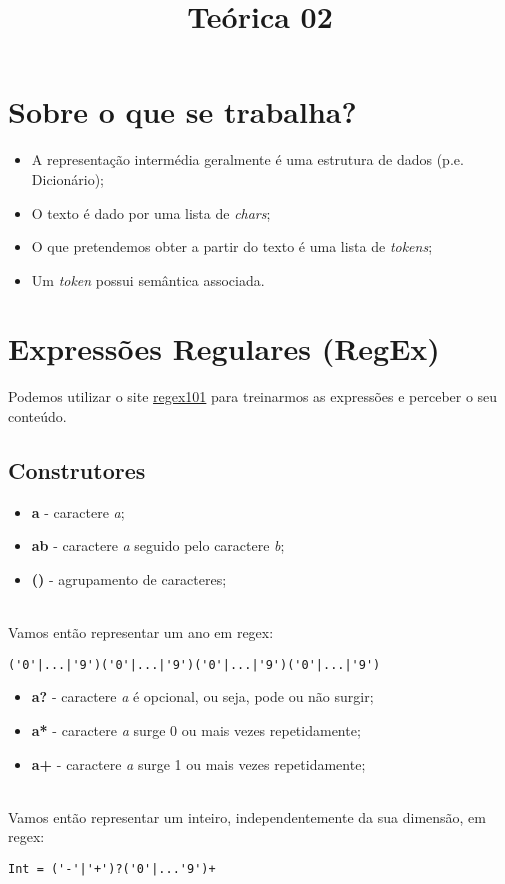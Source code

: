 \documentclass{article}
\begin{document}
\title{Teórica 02}
\maketitle
\section{Sobre o que se trabalha?}

\begin{itemize}
\item A representação intermédia geralmente é uma estrutura de dados (p.e. Dicionário);
\item O texto é dado por uma lista de \textit{chars};
\item O que pretendemos obter a partir do texto é uma lista de \textit{tokens};
\item Um \textit{token} possui semântica associada.
\end{itemize}
\section{Expressões Regulares (RegEx)}
Podemos utilizar o site \href{https://regex101.com}{regex101} para treinarmos as expressões e perceber o seu conteúdo.\\
 \subsection{Construtores}

\begin{itemize}
\item \textbf{a} - caractere \textit{a};
\item \textbf{ab} - caractere \textit{a} seguido pelo caractere \textit{b};
\item \textbf{()} - agrupamento de caracteres;
\end{itemize}
\\
 Vamos então representar um ano em regex:\\
 \begin{verbatim}
('0'|...|'9')('0'|...|'9')('0'|...|'9')('0'|...|'9')
\end{verbatim}
 
\begin{itemize}
\item \textbf{a?} - caractere \textit{a} é opcional, ou seja, pode ou não surgir;
\item \textbf{a*} - caractere \textit{a} surge 0 ou mais vezes repetidamente;
\item \textbf{a+} - caractere \textit{a} surge 1 ou mais vezes repetidamente;
\end{itemize}
\\
 Vamos então representar um inteiro, independentemente da sua dimensão, em regex:\\
 \begin{verbatim}
Int = ('-'|'+')?('0'|...'9')+
\end{verbatim}
 
\end{document}
